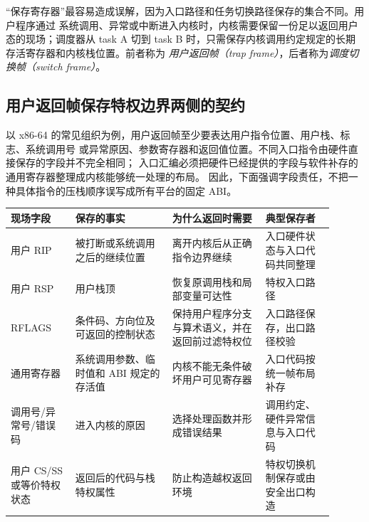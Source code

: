 “保存寄存器”最容易造成误解，因为入口路径和任务切换路径保存的集合不同。用户程序通过
系统调用、异常或中断进入内核时，内核需要保留一份足以返回用户态的现场；调度器从 task A
切到 task B 时，只需保存内核调用约定规定的长期存活寄存器和内核栈位置。前者称为
\emph{用户返回帧（trap frame）}，后者称为\emph{调度切换帧（switch frame）}。

\subsection{用户返回帧保存特权边界两侧的契约}

以 x86-64 的常见组织为例，用户返回帧至少要表达用户指令位置、用户栈、标志、系统调用号
或异常原因、参数寄存器和返回值位置。不同入口指令由硬件直接保存的字段并不完全相同；
入口汇编必须把硬件已经提供的字段与软件补存的通用寄存器整理成内核能够统一处理的布局。
因此，下面强调字段责任，不把一种具体指令的压栈顺序误写成所有平台的固定 ABI。

\begin{longtable}{|L{0.18\linewidth}|L{0.27\linewidth}|L{0.26\linewidth}|L{0.19\linewidth}|}
\hline
现场字段 & 保存的事实 & 为什么返回时需要 & 典型保存者 \\ \hline
用户 RIP & 被打断或系统调用之后的继续位置 & 离开内核后从正确指令边界继续 & 入口硬件状态与入口代码共同整理 \\ \hline
用户 RSP & 用户栈顶 & 恢复原调用栈和局部变量可达性 & 特权入口路径 \\ \hline
RFLAGS & 条件码、方向位及可返回的控制状态 & 保持用户程序分支与算术语义，并在返回前过滤特权位 & 入口路径保存，出口路径校验 \\ \hline
通用寄存器 & 系统调用参数、临时值和 ABI 规定的存活值 & 内核不能无条件破坏用户可见寄存器 & 入口代码按统一帧布局补存 \\ \hline
调用号/异常号/错误码 & 进入内核的原因 & 选择处理函数并形成错误结果 & 调用约定、硬件异常信息与入口代码 \\ \hline
用户 CS/SS 或等价特权状态 & 返回后的代码与栈特权属性 & 防止构造越权返回环境 & 特权切换机制保存或由安全出口构造 \\ \hline
\end{longtable}

